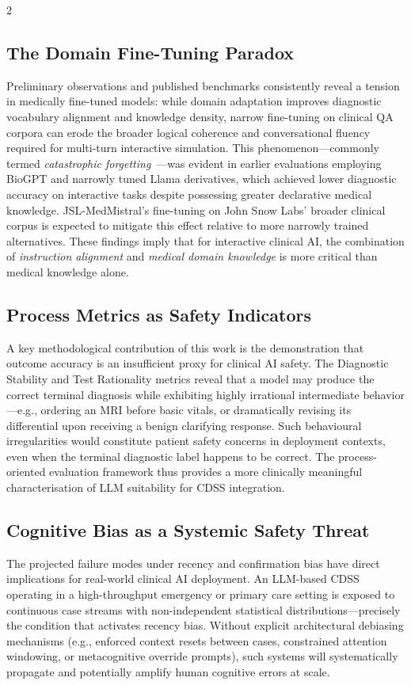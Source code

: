 \documentclass[10pt, a4paper]{article}
\begin{document}
\begin{multicols}{2}
\subsection{The Domain Fine-Tuning Paradox}

Preliminary observations and published benchmarks consistently reveal a tension in medically fine-tuned models: while domain adaptation improves diagnostic vocabulary alignment and knowledge density, narrow fine-tuning on clinical QA corpora can erode the broader logical coherence and conversational fluency required for multi-turn interactive simulation. This phenomenon—commonly termed \textit{catastrophic forgetting}~\cite{kirkpatrick2017overcoming}—was evident in earlier evaluations employing BioGPT and narrowly tuned Llama derivatives, which achieved lower diagnostic accuracy on interactive tasks despite possessing greater declarative medical knowledge. JSL-MedMistral's fine-tuning on John Snow Labs' broader clinical corpus is expected to mitigate this effect relative to more narrowly trained alternatives. These findings imply that for interactive clinical AI, the combination of \textit{instruction alignment} and \textit{medical domain knowledge} is more critical than medical knowledge alone.

\subsection{Process Metrics as Safety Indicators}

A key methodological contribution of this work is the demonstration that outcome accuracy is an insufficient proxy for clinical AI safety. The Diagnostic Stability and Test Rationality metrics reveal that a model may produce the correct terminal diagnosis while exhibiting highly irrational intermediate behavior—e.g., ordering an MRI before basic vitals, or dramatically revising its differential upon receiving a benign clarifying response. Such behavioural irregularities would constitute patient safety concerns in deployment contexts, even when the terminal diagnostic label happens to be correct. The process-oriented evaluation framework thus provides a more clinically meaningful characterisation of LLM suitability for CDSS integration.

\subsection{Cognitive Bias as a Systemic Safety Threat}

The projected failure modes under recency and confirmation bias have direct implications for real-world clinical AI deployment. An LLM-based CDSS operating in a high-throughput emergency or primary care setting is exposed to continuous case streams with non-independent statistical distributions—precisely the condition that activates recency bias. Without explicit architectural debiasing mechanisms (e.g., enforced context resets between cases, constrained attention windowing, or metacognitive override prompts), such systems will systematically propagate and potentially amplify human cognitive errors at scale.


\end{multicols}
\end{document}

